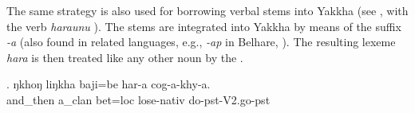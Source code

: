 	
The same strategy  is also used for borrowing  verbal stems into Yakkha (see \Next, with the  verb \emph{haraunu} ). The  stems are integrated into Yakkha by means of the suffix \emph{-a} (also found in related languages, e.g., \emph{-ap} in Belhare, \citealt[559]{Bickel2003Belhare}). The resulting lexeme \emph{hara} is then treated like any other noun by the .

\exg. ŋkhoŋ    liŋkha   baji=be    har-a cog-a-khy-a.\\
and\_then a\_clan bet{\sc =loc} lose{\sc -nativ} do{\sc [3sg]-pst-V2.go-pst}    \\

